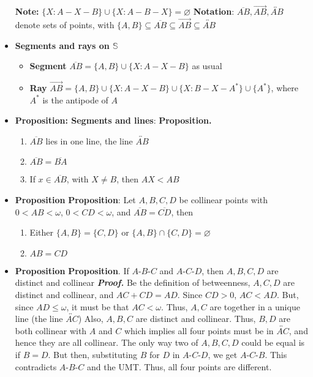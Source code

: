 \documentclass{report}
\begin{document}
\begin{itemize}
\begin{itemize}
        \end{itemize}
        \textbf{Note:} $\{X: A-X-B\} \cup \{X: A-B-X\} = \varnothing$
        \bigbreak \noindent 
        \textbf{Notation}: $\overline{AB}, \overrightarrow{AB}, \overleftrightarrow{AB}$ denote sets of points, with $\{A,B\} \subseteq \overline{AB} \subseteq \overrightarrow{AB} \subseteq \overleftrightarrow{AB}$
    \item \textbf{Segments and rays on $\mathbb{S}$}
        \begin{itemize}
            \item \textbf{Segment} $\overline{AB} = \{A,B\} \cup \{X: A-X-B\}$ as usual
            \item \textbf{Ray} $\overrightarrow{AB} = \{A,B\} \cup \{X: A-X-B\} \cup \{X: B-X-A^{*}\} \cup \{A^{*}\}$, where $A^{*}$ is the antipode of $A$
        \end{itemize}
    \item \textbf{Proposition: Segments and lines}:
        \bigbreak \noindent 
        \textbf{Proposition.}
        \begin{enumerate}[label=(\alph*)]
            \item $\overline{AB}$ lies in one line, the line $\overleftrightarrow{AB} $
            \item $\overline{AB} = \overline{BA} $
            \item If $x\in \overline{AB}$, with $X \ne B$, then $AX < AB $
        \end{enumerate}
    \item \textbf{Proposition}
        \bigbreak \noindent 
        \textbf{Proposition}: Let $A,B,C,D$ be collinear points with $0 < AB < \omega$, $0< CD<\omega$, and $\overline{AB} = \overline{CD}$, then
        \begin{enumerate}[label=(\alph*)]
            \item Either $\{A,B\} = \{C,D\}$ or $\{A,B\} \cap \{C,D\} = \varnothing$
            \item $AB = CD$
        \end{enumerate}
    \item \textbf{Proposition}
        \bigbreak \noindent 
        \textbf{Proposition}. If $A\text{-}B\text{-}C$ and $A\text{-}C\text{-}D$, then $A,B,C,D$ are distinct and collinear 
        \bigbreak \noindent 
        \textbf{\textit{Proof.}} Be the definition of betweenness, $A,C,D$ are distinct and collinear, and $AC + CD = AD$. Since $CD > 0$, $AC < AD$. But, since $AD \leq \omega$, it must be that $AC < \omega$. Thus, $A,C$ are together in a unique line  (the line $\overleftrightarrow{AC} $)
        \bigbreak \noindent 
        Also, $A,B,C$ are distinct and collinear. Thus, $B,D$ are both collinear with $A$ and $C$ which implies all four points must be in $\overleftrightarrow{AC}$, and hence they are all collinear.
        \bigbreak \noindent 
        The only way two of $A,B,C,D$ could be equal is if $B =D$. But then, substituting $B$ for $D$ in $A\text{-}C\text{-}D$, we get $A\text{-}C\text{-}B$. This contradicts $A\text{-}B\text{-}C$ and the UMT. Thus, all four points are different. \endpf


\end{itemize}
\end{document}
